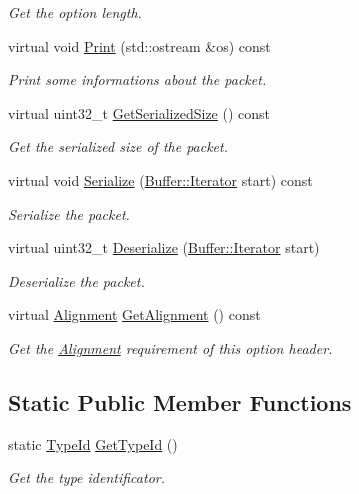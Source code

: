 \begin{DoxyCompactItemize}
\begin{DoxyCompactList}\small\item\em Get the option length. \end{DoxyCompactList}\item 
virtual void \hyperlink{classns3_1_1Ipv6OptionHeader_a4ba11e42c8cab1113c43388c6bd88b1a}{Print} (std\+::ostream \&os) const 
\begin{DoxyCompactList}\small\item\em Print some informations about the packet. \end{DoxyCompactList}\item 
virtual uint32\+\_\+t \hyperlink{classns3_1_1Ipv6OptionHeader_a91f5ff1fa3f76db91b45a642d083ea10}{Get\+Serialized\+Size} () const 
\begin{DoxyCompactList}\small\item\em Get the serialized size of the packet. \end{DoxyCompactList}\item 
virtual void \hyperlink{classns3_1_1Ipv6OptionHeader_aad98aee0f35bb8f1306a259fb286b5f7}{Serialize} (\hyperlink{classns3_1_1Buffer_1_1Iterator}{Buffer\+::\+Iterator} start) const 
\begin{DoxyCompactList}\small\item\em Serialize the packet. \end{DoxyCompactList}\item 
virtual uint32\+\_\+t \hyperlink{classns3_1_1Ipv6OptionHeader_a8645f1d17686431f177f7d5f3c38380e}{Deserialize} (\hyperlink{classns3_1_1Buffer_1_1Iterator}{Buffer\+::\+Iterator} start)
\begin{DoxyCompactList}\small\item\em Deserialize the packet. \end{DoxyCompactList}\item 
virtual \hyperlink{structns3_1_1Ipv6OptionHeader_1_1Alignment}{Alignment} \hyperlink{classns3_1_1Ipv6OptionHeader_adfd2a726d272c41d24aa80457b57ebbe}{Get\+Alignment} () const 
\begin{DoxyCompactList}\small\item\em Get the \hyperlink{structns3_1_1Ipv6OptionHeader_1_1Alignment}{Alignment} requirement of this option header. \end{DoxyCompactList}\end{DoxyCompactItemize}
\subsection*{Static Public Member Functions}
\begin{DoxyCompactItemize}
\item 
static \hyperlink{classns3_1_1TypeId}{Type\+Id} \hyperlink{classns3_1_1Ipv6OptionHeader_a91eb29f4ee452af3027c558ad25714ed}{Get\+Type\+Id} ()
\begin{DoxyCompactList}\small\item\em Get the type identificator. \end{DoxyCompactList}\end{DoxyCompactItemize}
